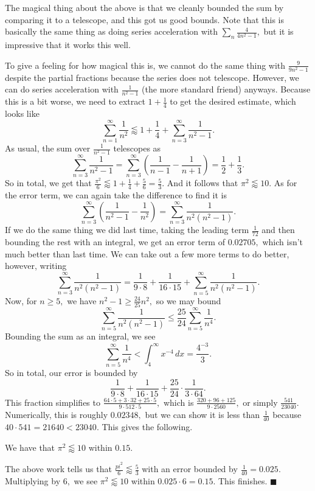 The magical thing about the above is that we cleanly bounded the sum by comparing it to a telescope, and this got us good bounds. Note that this is basically the same thing as doing series acceleration with $\sum_n\frac4{4n^2-1},$ but it is impressive that it works this well.

To give a feeling for how magical this is, we cannot do the same thing with $\frac9{9n^2-1}$ despite the partial fractions because the series does not telescope. However, we can do series acceleration with $\frac1{n^2-1}$ (the more standard friend) anyways. Because this is a bit worse, we need to extract $1+\frac14$ to get the desired estimate, which looks like
\[\sum_{n=1}^\infty\frac1{n^2}\lessapprox1+\frac14+\sum_{n=3}^\infty\frac1{n^2-1}.\]
As usual, the sum over $\frac1{n^2-1}$ telescopes as
\[\sum_{n=3}^\infty\frac1{n^2-1}=\sum_{n=3}^\infty\left(\frac1{n-1}-\frac1{n+1}\right)=\frac12+\frac13.\]
So in total, we get that $\frac{\pi^2}6\lessapprox1+\frac14+\frac56=\frac53.$ And it follows that $\pi^2\lessapprox10.$ As for the error term, we can again take the difference to find it is
\[\sum_{n=3}^\infty\left(\frac1{n^2-1}-\frac1{n^2}\right)=\sum_{n=3}^\infty\frac1{n^2\left(n^2-1\right)}.\]
If we do the same thing we did last time, taking the leading term $\frac1{72}$ and then bounding the rest with an integral, we get an error term of $0.02705,$ which isn't much better than last time. We can take out a few more terms to do better, however, writing
\[\sum_{n=3}^\infty\frac1{n^2\left(n^2-1\right)}=\frac1{9\cdot8}+\frac1{16\cdot15}+\sum_{n=5}^\infty\frac1{n^2\left(n^2-1\right)}.\]
Now, for $n\ge5,$ we have $n^2-1\ge\frac{24}{25}n^2,$ so we may bound
\[\sum_{n=5}^\infty\frac1{n^2\left(n^2-1\right)}\le\frac{25}{24}\sum_{n=5}^\infty\frac1{n^4}.\]
Bounding the sum as an integral, we see
\[\sum_{n=5}^\infty\frac1{n^4}<\int_4^\infty x^{-4}\,dx=\frac{4^{-3}}3.\]
So in total, our error is bounded by
\[\frac1{9\cdot8}+\frac1{16\cdot15}+\frac{25}{24}\cdot\frac1{3\cdot64}.\]
This fraction simplifies to $\frac{64\cdot5+3\cdot32+25\cdot5}{9\cdot512\cdot5},$ which is $\frac{320+96+125}{9\cdot2560},$ or simply $\frac{541}{23040}.$ Numerically, this is roughly $0.02348,$ but we can show it is less than $\frac1{40}$ because $40\cdot541=21640<23040.$ This gives the following.
\begin{proposition}
    We have that $\pi^2\lessapprox10$ within $0.15.$
\end{proposition}
The above work tells us that $\frac{pi^2}6\lessapprox\frac53$ with an error bounded by $\frac1{40}=0.025.$ Multiplying by $6,$ we see $\pi^2\lessapprox10$ within $0.025\cdot6=0.15.$ This finishes. $\blacksquare$

